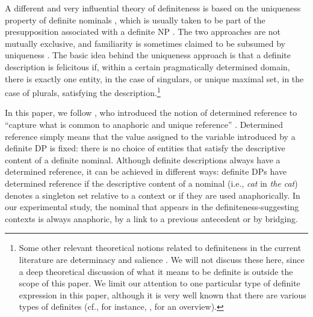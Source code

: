 \documentclass[output=paper]{langsci/langscibook}
\begin{document}
A different and very influential theory of definiteness is based on the uniqueness property of definite nominals \citep{russell:05}, which is usually taken to be part of the presupposition associated with a definite NP \citep{frege:1879,strawson:50}. The two approaches are not mutually exclusive, and familiarity is sometimes claimed to be subsumed by uniqueness \citep[see, for instance,][]{farkas:02,beaver:coppock:15}. The basic idea behind the uniqueness approach is that a definite description is felicitous if, within a certain pragmatically determined domain, there is exactly one entity, in the case of singulars, or unique maximal set, in the case of plurals, satisfying the description.\footnote{Some other relevant theoretical notions related to definiteness in the current literature are determinacy \citep{coppock:beaver:15} and salience \citep{vonheus:97}. We will not discuss these here, since a deep theoretical discussion of what it means to be definite is outside the scope of this paper. We limit our attention to one particular type of definite expression in this paper, although it is very well known that there are various types of definites (cf., for instance, \citealt{lyons:99}, for an overview).}

In this paper, we follow \cite{farkas:02}, who introduced the notion of determined reference to ``capture what is common to anaphoric and unique reference'' \citep[][221]{farkas:02}. Determined reference simply means that the value assigned to the variable introduced by a definite DP is fixed: there is no choice of entities that satisfy the descriptive content of a definite nominal. Although definite descriptions always have a determined reference, it can be achieved in different ways: definite DPs have determined reference if the descriptive content of a nominal (i.e., {\emph{cat}} in {\emph{the cat}}) denotes a singleton set relative to a context or if they are used anaphorically. In our experimental study, the nominal that appears in the definiteness-suggesting contexts is always anaphoric, by a link to a previous antecedent or by bridging. 
\end{document}

